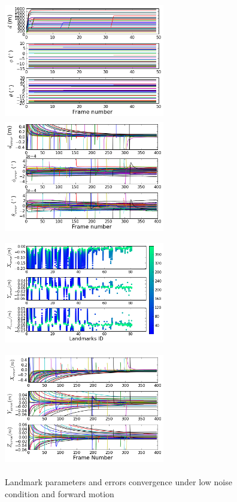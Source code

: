 \begin{figure}[h]
\centering
\includegraphics[width=7cm, height=5cm]{./Figures/SimulationFigures/Figure6.png}
\includegraphics[width=7cm, height=5cm]{./Figures/SimulationFigures/Figure7.png}
\includegraphics[width=7cm, height=5cm]{./Figures/SimulationFigures/Figure5.png}
\includegraphics[width=7cm, height=5cm]{./Figures/SimulationFigures/Figure8.png}
\caption{Landmark parameters and errors convergence under low noise
  condition and forward motion}
\label{fig:simfig5-8}
\end{figure}

